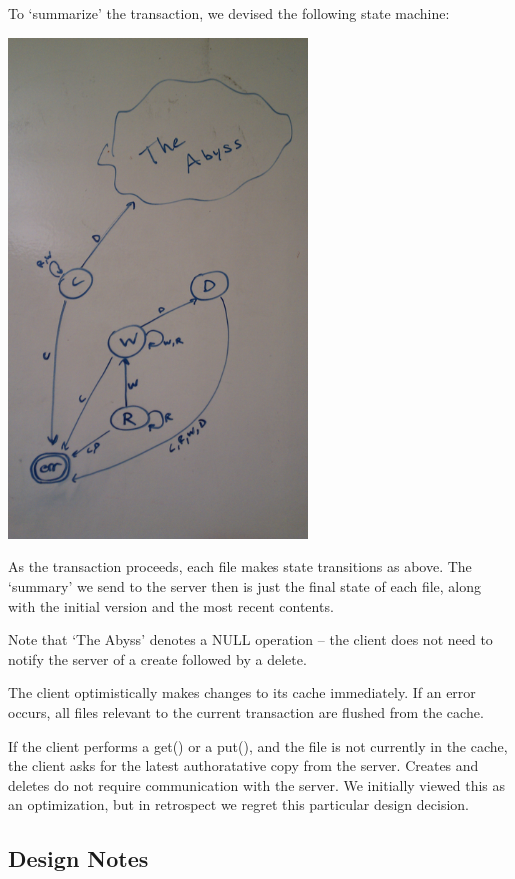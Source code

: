 \documentclass[12pt]{article}
\begin{document}
To `summarize' the transaction, we devised the following state machine:

\begin{center}
\includegraphics[width=300px]{a3_states.png}
\end{center}

As the transaction proceeds, each file makes state transitions as above. The `summary' we send to the server then is just the final state of each file, along with the initial version and the most recent contents. 

Note that `The Abyss' denotes a NULL operation -- the client does not need to notify the server of a create followed by a delete.

The client optimistically makes changes to its cache immediately. If an error occurs, all files relevant to the current transaction are flushed from the cache.

If the client performs a get() or a put(), and the file is not currently in the cache, the client asks for the latest authoratative copy from the server. Creates and deletes do not require communication with the server. We initially viewed this as an optimization, but in retrospect we regret this particular design decision.

\subsection{Design Notes}
\end{document}
